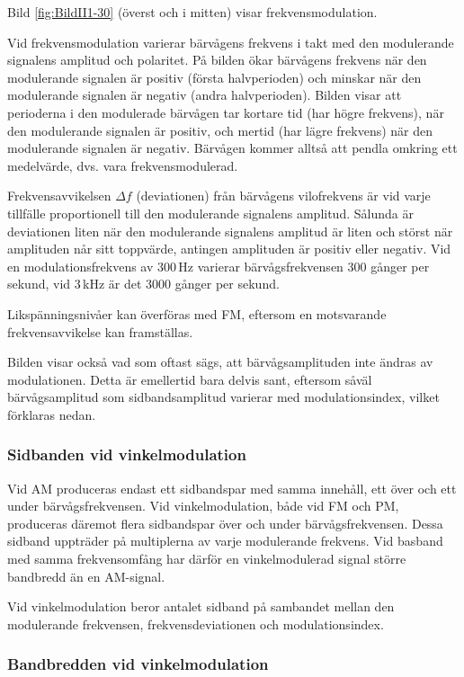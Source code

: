 Bild \ref{fig:BildII1-30} (överst och i mitten) visar frekvensmodulation.

Vid frekvensmodulation varierar bärvågens frekvens i takt med den modulerande
signalens amplitud och polaritet.
På bilden ökar bärvågens frekvens när den modulerande signalen är positiv
(första halvperioden) och minskar när den modulerande signalen är negativ
(andra halvperioden).
Bilden visar att perioderna i den modulerade bärvågen tar kortare tid (har
högre frekvens), när den modulerande signalen är positiv, och mertid (har lägre
frekvens) när den modulerande signalen är negativ.
Bärvågen kommer alltså att pendla omkring ett medelvärde, dvs. vara
frekvensmodulerad.

Frekvensavvikelsen \(\Delta f\) (deviationen) från bärvågens vilofrekvens är
vid varje tillfälle proportionell till den modulerande signalens amplitud.
Sålunda är deviationen liten när den modulerande signalens amplitud är liten
och störst när amplituden når sitt toppvärde, antingen amplituden är positiv
eller negativ.
Vid en modulationsfrekvens av 300\,Hz varierar bärvågsfrekvensen 300 gånger per
sekund, vid 3\,kHz är det \num{3000} gånger per sekund.

Likspänningsnivåer kan överföras med FM, eftersom en motsvarande
frekvensavvikelse kan framställas.

Bilden visar också vad som oftast sägs, att bärvågsamplituden inte ändras av
modulationen.
Detta är emellertid bara delvis sant, eftersom såväl bärvågsamplitud som
sidbandsamplitud varierar med modulationsindex, vilket förklaras nedan.

\subsubsection{Sidbanden vid vinkelmodulation}

Vid AM produceras endast ett sidbandspar med samma innehåll, ett över och ett
under bärvågsfrekvensen.
Vid vinkelmodulation, både vid FM och PM, produceras däremot flera sidbandspar
över och under bärvågsfrekvensen.
Dessa sidband uppträder på multiplerna av varje modulerande frekvens.
Vid basband med samma frekvensomfång har därför en vinkelmodulerad signal
större bandbredd än en AM-signal.

Vid vinkelmodulation beror antalet sidband på sambandet mellan den modulerande
frekvensen, frekvensdeviationen och modulationsindex.

\subsubsection{Bandbredden vid vinkelmodulation}

